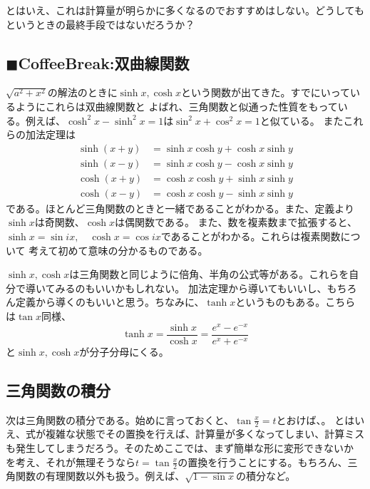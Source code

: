 \documentclass[a4j,dvipdfmx]{jsarticle}
\begin{document}
とはいえ、これは計算量が明らかに多くなるのでおすすめはしない。どうしてもというときの最終手段ではないだろうか？\\
\hrulefill
\subsection{$\blacksquare$CoffeeBreak:双曲線関数}
\begin{screen}
    $\sqrt{a^2+x^2}$の解法のときに$\sinh x,\cosh x$という関数が出てきた。すでにいっているようにこれらは双曲線関数と
    よばれ、三角関数と似通った性質をもっている。例えば、$\cosh^2 x-\sinh^2 x=1$は$\sin^2 x+\cos^2 x=1$と似ている。
    またこれらの加法定理は
    \begin{align*}
        \sinh(x+y)&=\sinh x\cosh y+\cosh x\sinh y\\
        \sinh(x-y)&=\sinh x\cosh y-\cosh x\sinh y\\
        \cosh(x+y)&=\cosh x\cosh y+\sinh x\sinh y\\
        \cosh(x-y)&=\cosh x\cosh y-\sinh x\sinh y
    \end{align*}
    である。ほとんど三角関数のときと一緒であることがわかる。また、定義より$\sinh x$は奇関数、$\cosh x$は偶関数である。
    また、数を複素数まで拡張すると、$\sinh x=\sin ix,\quad \cosh x=\cos ix$であることがわかる。これらは複素関数について
    考えて初めて意味の分かるものである。

    $\sinh x,\cosh x$は三角関数と同じように倍角、半角の公式等がある。これらを自分で導いてみるのもいいかもしれない。
    加法定理から導いてもいいし、もちろん定義から導くのもいいと思う。ちなみに、$\tanh x$というものもある。こちらは$\tan x$同様、
    \begin{equation*}
        \tanh x=\frac{\sinh x}{\cosh x}=\frac{e^x-e^{-x}}{e^x+e^{-x}}
    \end{equation*}
    と$\sinh x,\cosh x$が分子分母にくる。
\end{screen}
\newpage
\subsection{三角関数の積分}
次は三角関数の積分である。始めに言っておくと、$\tan\frac{x}{2}=t$とおけば、。
とはいえ、式が複雑な状態でその置換を行えば、計算量が多くなってしまい、計算ミスも発生してしまうだろう。そのためここでは、まず簡単な形に変形できないか
を考え、それが無理そうなら$t=\tan\frac{x}{2}$の置換を行うことにする。もちろん、三角関数の有理関数以外も扱う。例えば、$\sqrt{1-\sin x}$の積分など。
\end{document}
